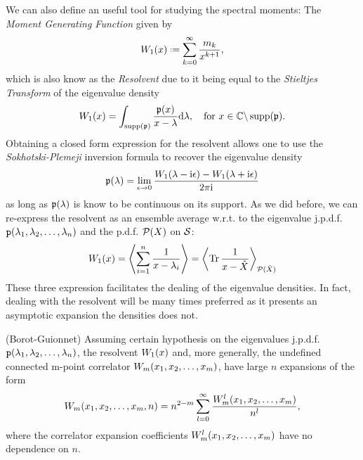 We can also define an useful tool for studying the spectral moments: The \textit{Moment Generating Function} given by
\begin{equation}
	\W_1(x) \deff \sum_{k=0}^{\infty} \frac{\me_k}{x^{k+1}},
\end{equation} 
which is also know as the \textit{Resolvent} due to it being equal to the \textit{Stieltjes Transform} of the eigenvalue density
\begin{equation}
	W_1(x) = \int_{\operatorname{supp}(\mathfrak{p})} \frac{\mathfrak{p}(x)}{x - \lambda} \mathrm{d} \lambda, \quad \text{for} \ x \in \mathbb{C} \backslash \operatorname{supp}(\mathfrak{p}).
\end{equation}
Obtaining a closed form expression for the resolvent allows one to use the \textit{Sokhotski-Plemeji} inversion formula to recover the eigenvalue density
\begin{equation}
	\mathfrak{p}(\lambda) = \lim_{\epsilon \rightarrow 0} \frac{W_1(\lambda - \mathrm{i} \epsilon) - W_1(\lambda + \mathrm{i} \epsilon)}{2\pi \mathrm{i}}
\end{equation}
as long as $\mathfrak{p}(\lambda)$ is know to be continuous on its support. As we did before, we can re-express the resolvent as an ensemble average w.r.t. to the eigenvalue j.p.d.f. $\mathtt{p}(\lambda_1, \lambda_2, \dots, \lambda_n)$ and the p.d.f. $\mathcal{P}(X)$ on $\mathcal{S}$:
\begin{equation}
	W_1(x) = \left\langle \sum_{i=1}^{n} \frac{1}{x - \lambda_i} \right\rangle =  \left\langle \operatorname{Tr} \frac{1}{x - \hat X} \right\rangle_{\mathcal{P}(\hat X)}
\end{equation}  
These three expression facilitates the dealing of the eigenvalue densities. In fact, dealing with the resolvent will be many times preferred as it presents an asymptotic expansion the densities does not.

\begin{thm}
	(Borot-Guionnet) Assuming certain hypothesis on the eigenvalues j.p.d.f. $\mathtt{p}(\lambda_1, \lambda_2, \dots, \lambda_n)$, the resolvent $W_1(x)$ and, more generally, the undefined connected m-point correlator $W_m(x_1, x_2, \dots, x_m)$, have large $n$ expansions of the form
	\begin{equation}
		W_m(x_1, x_2, \dots, x_m, n) = n^{2-m} \sum_{l=0}^{\infty} \frac{W^l_m(x_1, x_2, \dots, x_m)}{n^l},
	\end{equation}
	where the correlator expansion coefficients $W^l_m(x_1, x_2, \dots, x_m)$ have no dependence on $n$.
\end{thm}

